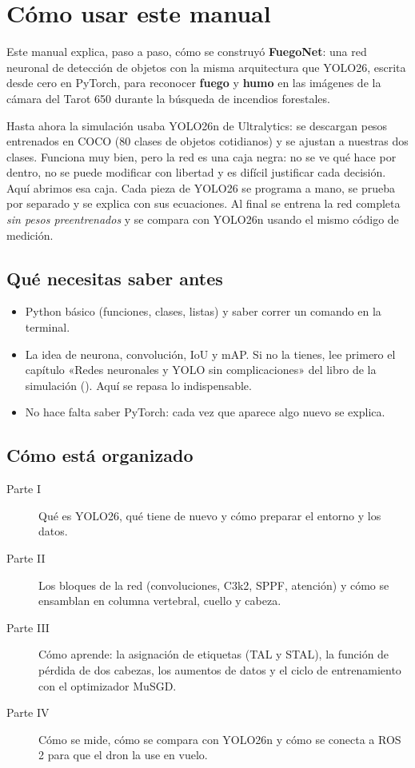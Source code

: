 \chapter*{Cómo usar este manual}

Este manual explica, paso a paso, cómo se construyó \textbf{FuegoNet}: una red
neuronal de detección de objetos con la misma arquitectura que YOLO26, escrita
desde cero en PyTorch, para reconocer \textbf{fuego} y \textbf{humo} en las
imágenes de la cámara del Tarot 650 durante la búsqueda de incendios forestales.

Hasta ahora la simulación usaba YOLO26n de Ultralytics: se descargan pesos
entrenados en COCO (80 clases de objetos cotidianos) y se ajustan a nuestras dos
clases. Funciona muy bien, pero la red es una caja negra: no se ve qué hace por
dentro, no se puede modificar con libertad y es difícil
justificar cada decisión. Aquí abrimos esa caja. Cada pieza de YOLO26 se
programa a mano, se prueba por separado y se explica con sus ecuaciones. Al final
se entrena la red completa \emph{sin pesos preentrenados} y se compara con
YOLO26n usando el mismo código de medición.

\section*{Qué necesitas saber antes}
\begin{itemize}
  \item Python básico (funciones, clases, listas) y saber correr un comando en la terminal.
  \item La idea de neurona, convolución, IoU y mAP. Si no la tienes, lee primero
        el capítulo «Redes neuronales y YOLO sin complicaciones» del libro de la
        simulación (). Aquí se repasa lo indispensable.
  \item No hace falta saber PyTorch: cada vez que aparece algo nuevo se explica.
\end{itemize}

\section*{Cómo está organizado}
\begin{description}
  \item[Parte I] Qué es YOLO26, qué tiene de nuevo y cómo preparar el entorno y los datos.
  \item[Parte II] Los bloques de la red (convoluciones, C3k2, SPPF, atención) y cómo se
        ensamblan en columna vertebral, cuello y cabeza.
  \item[Parte III] Cómo aprende: la asignación de etiquetas (TAL y STAL), la función
        de pérdida de dos cabezas, los aumentos de datos y el ciclo de entrenamiento
        con el optimizador MuSGD.
  \item[Parte IV] Cómo se mide, cómo se compara con YOLO26n y cómo se conecta a ROS 2
        para que el dron la use en vuelo.
\end{description}

